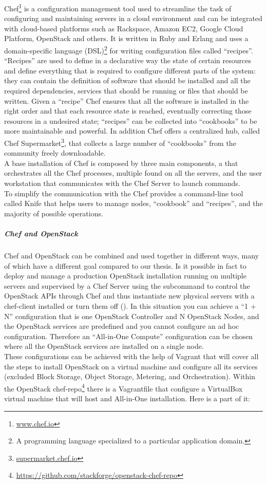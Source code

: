 Chef\footnote{\url{www.chef.io}} is a configuration management tool used to streamline the task of configuring and maintaining servers in a cloud environment and can be integrated with cloud-based platforms such as Rackspace, Amazon EC2, Google Cloud Platform, OpenStack and others. It is written in Ruby and Erlang and uses a domain-specific language (DSL)\footnote{A programming language specialized to a particular application domain.} for writing configuration files called ``recipes''. ``Recipes'' are used to define in a declarative way the state of certain resources and define everything that is required to configure different parts of the system: they can contain the definition of software that should be installed and all the required dependencies, services that should be running or files that should be written. Given a ``recipe'' Chef ensures that all the software is installed in the right order and that each resource state is reached, eventually correcting those resources in a undesired state; ``recipes'' can be collected into ``cookbooks'' to be more maintainable and powerful. In addition Chef offers a centralized hub, called Chef Supermarket\footnote{\url{supermarket.chef.io}}, that collects a large number of ``cookbooks'' from the community freely downloadable.\\
A base installation of Chef is composed by three main components, a  that orchestrates all the Chef processes, multiple  found on all the servers, and the user workstation that communicates with the Chef Server to launch commands.\\
To simplify the communication with the  Chef provides a command-line tool called Knife that helps users to manage nodes, ``cookbook'' and ``recipes'', and the majority of possible operations.

\subparagraph{Chef and OpenStack}
\label{subp:sota_chef_openstack}

Chef and OpenStack can be combined and used together in different ways, many of which have a different goal compared to our thesis. Is it possible in fact to deploy and manage a production OpenStack installation running on multiple servers and supervised by a Chef Server using the subcommand  to control the OpenStack APIs through Chef and thus instantiate new physical servers with a chef-client installed or turn them off ().
In this situation you can achieve a ``1 + N'' configuration that is one OpenStack Controller and N OpenStack Nodes, and the OpenStack services are predefined and you cannot configure an ad hoc configuration.
Therefore an ``All-in-One Compute'' configuration can be chosen where all the OpenStack services are installed on a single node.\\
These configurations can be achieved with the help of Vagrant that will cover all the steps to install OpenStack on a virtual machine and configure all its services (excluded Block Storage, Object Storage, Metering, and Orchestration). Within the OpenStack chef-repo\footnote{\url{https://github.com/stackforge/openstack-chef-repo}} there is a Vagrantfile that configure a VirtualBox virtual machine that will host and All-in-One installation. Here is a part of it:

